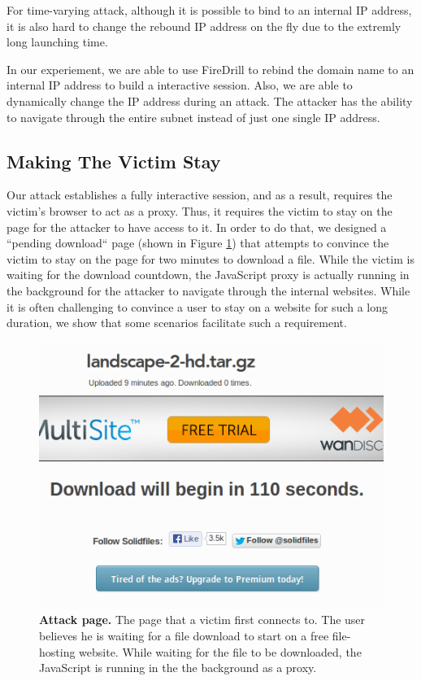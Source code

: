 For time-varying attack, although it is possible to bind to an internal IP address, it is also hard to change the rebound IP address on the fly due to the extremly long launching time. 

In our experiement, we are able to use FireDrill to rebind the domain name to an internal IP address to build a interactive session. Also, we are able to dynamically change the IP address during an attack. The attacker has the ability to navigate through the entire subnet instead of just one single IP address.

\subsection{Making The Victim Stay}
Our attack establishes a fully interactive session, and as a result, requires the victim's browser to act as a proxy. Thus, it requires the victim to stay on the page for the attacker to have access to it. In order to do that, we designed a ``pending download`` page (shown in Figure \ref{fig:download}) that attempts to convince the victim to stay on the page for two minutes to download a file. While the victim is waiting for the download countdown, the JavaScript proxy is actually running in the background for the attacker to navigate through the internal websites. While it is often challenging to convince a user to stay on a website for such a long duration, we show that some scenarios facilitate such a requirement.

\begin{figure}[t]
\centering
\includegraphics[width=0.8\columnwidth]{download.png}
\caption{\textbf{Attack page.} The page that a victim first connects to. The user believes he is waiting for a file download to start on a free file-hosting website. While waiting for the file to be downloaded, the JavaScript is running in the the background as a proxy.}
\label{fig:download}
\end{figure}

